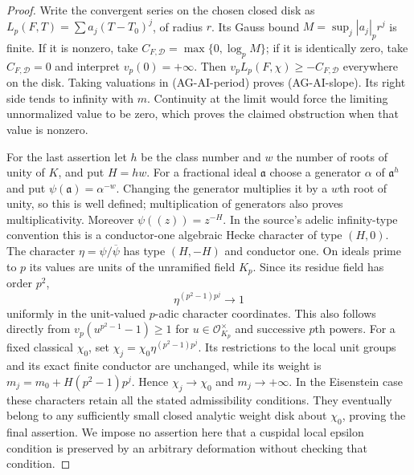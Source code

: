 \documentclass[11pt,a4paper]{article}
\begin{document}
\begin{proof}
Write the convergent series on the chosen closed disk as
$L_p(F,T)=\sum a_j(T-T_0)^j$, of radius $r$.  Its Gauss bound
$M=\sup_j|a_j|_p r^j$ is finite.  If it is nonzero, take
$C_{F,\mathcal D}=\max\{0,\log_p M\}$; if it is identically zero,
take $C_{F,\mathcal D}=0$ and interpret $v_p(0)=+\infty$.
Then $v_pL_p(F,\chi)\geq-C_{F,\mathcal D}$ everywhere on the
disk.  Taking valuations in (AG-AI-period) proves (AG-AI-slope).
Its right side tends to infinity with $m$.  Continuity at the
limit would force the limiting unnormalized value to be zero,
which proves the claimed obstruction when that value is nonzero.

For the last assertion let $h$ be the class number and $w$ the
number of roots of unity of $K$, and put $H=hw$.  For a fractional
ideal $\mathfrak a$ choose a generator $\alpha$ of $\mathfrak a^h$
and put $\psi(\mathfrak a)=\alpha^{-w}$.  Changing the generator
multiplies it by a $w$th root of unity, so this is well defined;
multiplication of generators also proves multiplicativity.
Moreover $\psi((z))=z^{-H}$.  In the source's adelic infinity-type
convention this is a conductor-one algebraic Hecke character of
type $(H,0)$.  The character
$\eta=\psi/\overline\psi$ has type $(H,-H)$ and conductor one.
On ideals prime to $p$ its values are units of the unramified field
$K_p$.  Since its residue field has order $p^2$,
\[
      \eta^{(p^2-1)p^j}\longrightarrow1
\]
uniformly in the unit-valued $p$-adic character coordinates.  This
also follows directly from $v_p(u^{p^2-1}-1)\geq1$ for
$u\in\mathcal O_{K_p}^{\times}$ and successive $p$th powers.
For a fixed classical $\chi_0$, set
$\chi_j=\chi_0\eta^{(p^2-1)p^j}$.  Its restrictions to the local unit groups and its exact
finite conductor are unchanged, while its weight is
$m_j=m_0+H(p^2-1)p^j$.  Hence $\chi_j\to\chi_0$ and
$m_j\to+\infty$.  In the Eisenstein case these characters retain
all the stated admissibility conditions.  They eventually belong
to any sufficiently small closed analytic weight disk about
$\chi_0$, proving the final assertion.  We impose no assertion here
that a cuspidal local epsilon condition is preserved by an
arbitrary deformation without checking that condition.
\end{proof}
\end{document}

